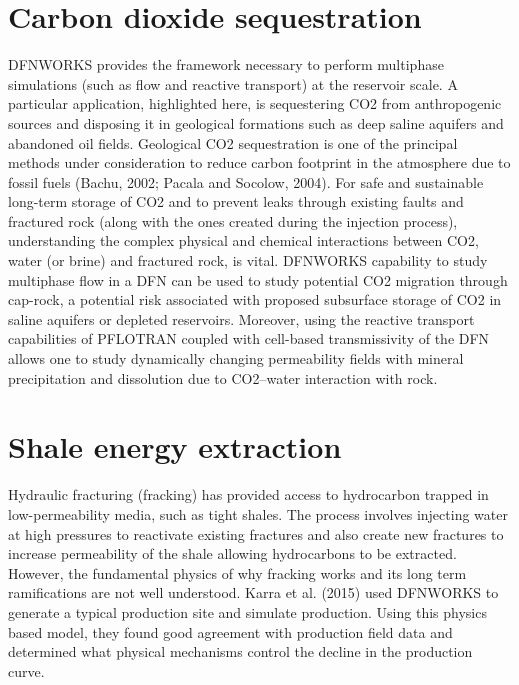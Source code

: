 \documentclass[letterpaper,10pt,english]{sphinxmanual}
\begin{document}
\section{Carbon dioxide sequestration}
\label{applications:carbon-dioxide-sequestration}
DFNWORKS provides the framework necessary to perform multiphase simulations (such as flow and reactive transport) at the reservoir scale. A particular application, highlighted here, is sequestering CO2 from anthropogenic sources and disposing it in geological formations such as deep saline aquifers and abandoned oil fields. Geological CO2 sequestration is one of the principal methods under consideration to reduce carbon footprint in the atmosphere due to fossil fuels (Bachu, 2002; Pacala and Socolow, 2004). For safe and sustainable long-term storage of CO2 and to prevent leaks through existing faults and fractured rock (along with the ones created during the injection process), understanding the complex physical and chemical interactions between CO2, water (or brine) and fractured rock, is vital. DFNWORKS capability to study multiphase flow in a DFN can be used to study potential CO2 migration through cap-rock, a potential risk associated with proposed subsurface storage of CO2 in saline aquifers or depleted reservoirs. Moreover, using the reactive transport capabilities of PFLOTRAN coupled with cell-based transmissivity of the DFN allows one to study dynamically changing permeability fields with mineral precipitation and dissolution due to CO2–water interaction with rock.


\section{Shale energy extraction}
\label{applications:shale-energy-extraction}
Hydraulic fracturing (fracking) has provided access to hydrocarbon trapped in low-permeability media, such as tight shales. The process involves injecting water at high pressures to reactivate existing fractures and also create new fractures to increase permeability of the shale allowing hydrocarbons to be extracted. However, the fundamental physics of why fracking works and its long term ramifications are not well understood. Karra et al. (2015) used DFNWORKS to generate a typical production site and simulate production. Using this physics based model, they found good agreement with production field data and determined what physical mechanisms control the decline in the production curve.
\end{document}
